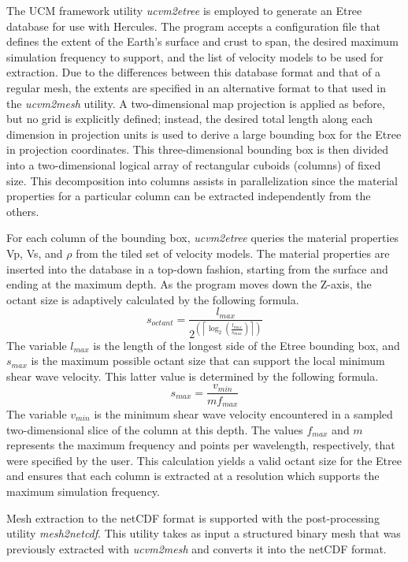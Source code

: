 The UCM framework utility \emph{ucvm2etree} is employed to generate an Etree database for use with Hercules. The program accepts a configuration file that defines the extent of the Earth's surface and crust to span, the desired maximum simulation frequency to support, and the list of velocity models to be used for extraction. Due to the differences between this database format and that of a regular mesh, the extents are specified in an alternative format to that used in the \emph{ucvm2mesh} utility. A two-dimensional map projection is applied as before, but no grid is explicitly defined; instead, the desired total length along each dimension in projection units is used to derive a large bounding box for the Etree in projection coordinates. This three-dimensional bounding box is then divided into a two-dimensional logical array of rectangular cuboids (columns) of fixed size. This decomposition into columns assists in parallelization since the material properties for a particular column can be extracted independently from the others.

For each column of the bounding box, \emph{ucvm2etree} queries the material properties Vp, Vs, and $\rho$ from the tiled set of velocity models. The material properties are inserted into the database in a top-down fashion, starting from the surface and ending at the maximum depth. As the program moves down the Z-axis, the octant size is adaptively calculated by the following formula.
\begin{equation*}
s_{octant} = \frac{l_{max}}{ 2^{\left( \left\lceil \log_{2}(\frac{l_{max}}{s_{max}}) \right\rceil \right)} }
\end{equation*}
The variable $l_{max}$ is the length of the longest side of the Etree bounding box, and $s_{max}$ is the maximum possible octant size that can support the local minimum shear wave velocity. This latter value is determined by the following formula.
\begin{equation*}
s_{max} = \frac{v_{min}}{m f_{max}}
\end{equation*}
The variable $v_{min}$ is the minimum shear wave velocity encountered in a sampled two-dimensional slice of the column at this depth. The values $f_{max}$ and $m$ represents the maximum frequency and points per wavelength, respectively, that were specified by the user. This calculation yields a valid octant size for the Etree and ensures that each column is extracted at a resolution which supports the maximum simulation frequency.

Mesh extraction to the netCDF format is supported with the post-processing utility \emph{mesh2netcdf}. This utility takes as input a structured binary mesh that was previously extracted with \emph{ucvm2mesh} and converts it into the netCDF format.

